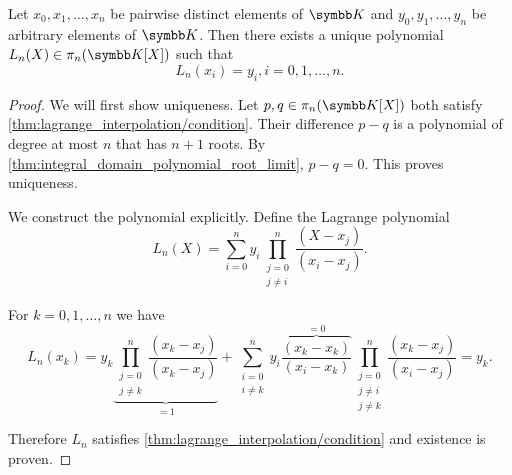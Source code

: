 \begin{theorem}\label{thm:lagrange_interpolation}
  Let \( x_0, x_1, \ldots, x_n \) be pairwise distinct elements of \( \BK \) and \( y_0, y_1, \ldots, y_n \) be arbitrary elements of \( \BK \). Then there exists a unique polynomial \( L_n(X) \in \pi_n(\BK[X]) \) such that
  \begin{equation}\label{thm:lagrange_interpolation/condition}
    L_n(x_i) = y_i, i = 0, 1, \ldots, n.
  \end{equation}
\end{theorem}
\begin{proof}
  We will first show uniqueness. Let \( p, q \in \pi_n(\BK[X]) \) both satisfy \cref{thm:lagrange_interpolation/condition}. Their difference \( p - q \) is a polynomial of degree at most \( n \) that has \( n + 1 \) roots. By \cref{thm:integral_domain_polynomial_root_limit}, \( p - q = 0 \). This proves uniqueness.

  We construct the polynomial explicitly. Define the Lagrange polynomial
  \begin{equation*}
    L_n(X) = \sum_{i=0}^n y_i \prod_{\substack{j = 0 \\ j \neq i}}^n \frac {(X - x_j)} {(x_i - x_j)}.
  \end{equation*}

  For \( k = 0, 1, \ldots, n \) we have
  \begin{equation*}
    L_n(x_k) = y_k \underbrace{\prod_{\substack{j = 0 \\ j \neq k}}^n \frac {(x_k - x_j)} {(x_k - x_j)}}_{=1} + \sum_{\substack{i = 0 \\ i \neq k}}^n y_i \overbrace{\frac{(x_k - x_k)}{(x_i - x_k)}}^{=0} \prod_{\substack{j = 0 \\ j \neq i \\ j \neq k}}^n \frac {(x_k - x_j)} {(x_i - x_j)} = y_k.
  \end{equation*}

  Therefore \( L_n \) satisfies \cref{thm:lagrange_interpolation/condition} and existence is proven.
\end{proof}
